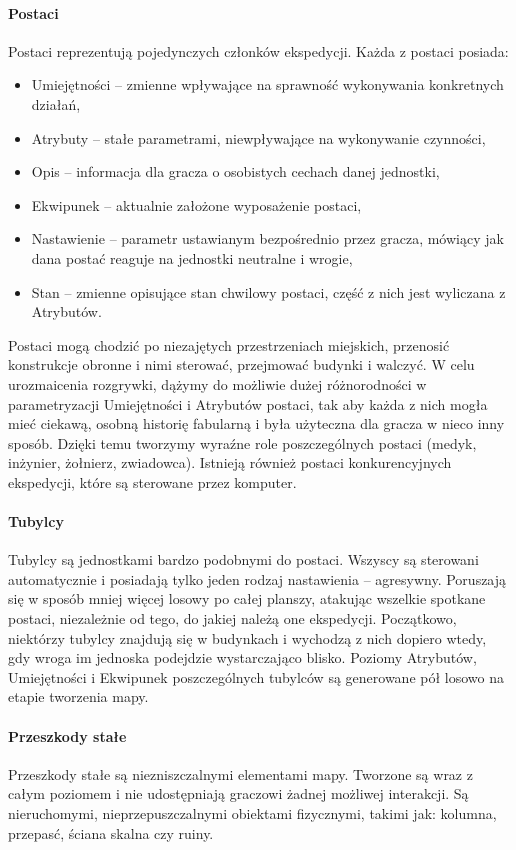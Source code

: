 \documentclass[licencjacka]{pracamgr}
\begin{document}
      \paragraph{Postaci}
	Postaci reprezentują pojedynczych członków ekspedycji. Każda z postaci posiada:
	\begin{itemize}
	 \item Umiejętności -- zmienne wpływające na sprawność wykonywania konkretnych działań,
	 \item Atrybuty -- stałe parametrami, niewpływające na wykonywanie czynności,
	 \item Opis -- informacja dla gracza o osobistych cechach danej jednostki,
	 \item Ekwipunek -- aktualnie założone wyposażenie postaci,
	 \item Nastawienie -- parametr ustawianym bezpośrednio przez gracza, mówiący jak dana postać reaguje na jednostki neutralne i wrogie,
	 \item Stan -- zmienne opisujące stan chwilowy postaci, część z nich jest wyliczana z Atrybutów.
	\end{itemize}
	Postaci mogą chodzić po niezajętych przestrzeniach miejskich, przenosić konstrukcje obronne i nimi sterować,
	przejmować budynki i walczyć. W celu urozmaicenia rozgrywki, dążymy do możliwie dużej różnorodności w parametryzacji
	Umiejętności i Atrybutów postaci, tak aby każda z nich mogła mieć ciekawą, osobną historię fabularną i była użyteczna
	dla gracza w nieco inny sposób. Dzięki temu tworzymy wyraźne role poszczególnych postaci (medyk, inżynier, żołnierz, zwiadowca).
	Istnieją również postaci konkurencyjnych ekspedycji, które są sterowane przez komputer.
      \paragraph{Tubylcy}
	Tubylcy są jednostkami bardzo podobnymi do postaci. Wszyscy są sterowani automatycznie i posiadają tylko jeden rodzaj
	nastawienia -- agresywny. Poruszają się w sposób mniej więcej losowy po całej planszy, atakując wszelkie spotkane postaci,
	niezależnie od tego, do jakiej należą one ekspedycji. Początkowo, niektórzy tubylcy znajdują się w budynkach i wychodzą z 
	nich dopiero wtedy, gdy wroga im jednoska podejdzie wystarczająco blisko. Poziomy Atrybutów, Umiejętności i Ekwipunek poszczególnych
	tubylców są generowane pół losowo na etapie tworzenia mapy.
      \paragraph{Przeszkody stałe}
	Przeszkody stałe są niezniszczalnymi elementami mapy. Tworzone są wraz z całym poziomem i nie udostępniają graczowi żadnej
	możliwej interakcji. Są nieruchomymi, nieprzepuszczalnymi obiektami fizycznymi, takimi jak: kolumna, przepasć, ściana skalna czy ruiny.
\end{document}
